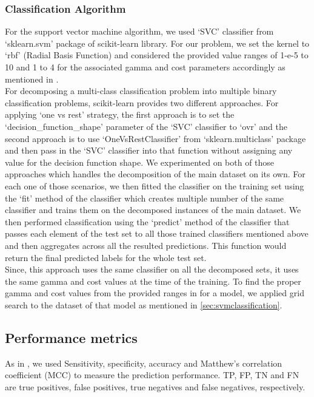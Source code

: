     \subsubsection{Classification Algorithm}
    \label{subsub:scikitPredAlg}
    For the support vector machine algorithm, we used `SVC' classifier from `sklearn.svm' package of scikit-learn library. 
    For our problem, we set the kernel to `rbf' (Radial Basis Function) and considered the provided value ranges of 
    1-e-5 to 10  and 1 to 4 for the associated gamma and cost parameters accordingly as mentioned in \cite{mishra2014prediction}.\\

    For decomposing a multi-class classification problem into multiple binary classification problems, scikit-learn provides 
    two different approaches. For applying `one vs rest' strategy, the first approach is to set the `decision\_function\_shape' 
    parameter of the `SVC' classifier to `ovr' and the second approach is to use `OneVsRestClassifier' from `sklearn.multiclass' 
    package and then pass in the `SVC' classifier into that function without assigning any value for the decision function 
    shape. We experimented on both of those approaches which handles the decomposition of the main dataset on its own. For 
    each one of those scenarios, we then fitted the classifier on the training set using the `fit' method of the classifier 
    which creates multiple number of the same classifier and trains them on the decomposed instances of the main dataset.
    We then performed classification using the `predict' method of the classifier that passes each element of the test set to 
    all those trained classifiers mentioned above and then aggregates across all the resulted predictions. 
    This function would return the final predicted labels for the whole test set.\\ 

    Since, this approach uses the same classifier on all the decomposed sets, it uses the same gamma and cost 
    values at the time of the training. 
    To find the proper gamma and cost values from the provided ranges in \cite{mishra2014prediction} for a model, we applied 
    grid search to the dataset of that model as mentioned in \ref{sec:svmclassification}. 


\subsection{Performance metrics}
\label{subsec:metrics}
    As in \cite{mishra2014prediction}, we used Sensitivity, specificity, accuracy and Matthew's correlation coefficient (MCC) 
    to measure the prediction performance. TP, FP, TN and FN are true positives, false positives, 
    true negatives and false negatives, respectively. \\

